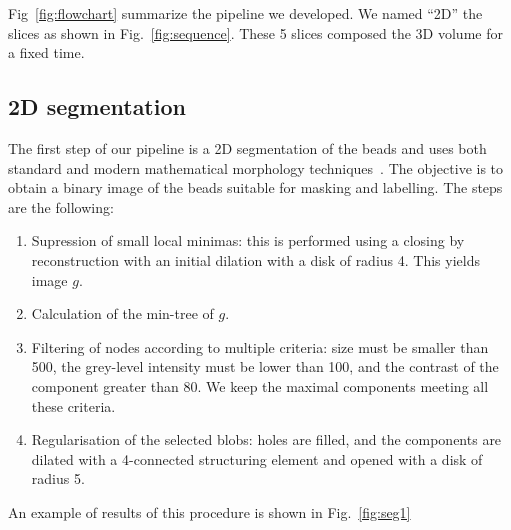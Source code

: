 \documentclass{llncs}
\begin{document}
Fig~\ref{fig:flowchart} summarize the pipeline we developed. We named ``2D'' the slices as shown in Fig.~\ref{fig:sequence}. These 5 slices composed the 3D volume for a fixed time.

\subsection{2D segmentation}
The first step of our pipeline is a 2D segmentation of the beads and uses both standard and modern mathematical morphology techniques~\cite{najman-talbot-Wiley-2010}. The objective is to obtain a binary image of the beads suitable for masking and labelling. The steps are the following:
\begin{enumerate}
\item Supression of small local minimas: this is performed using a closing by reconstruction with an initial dilation with a disk of radius 4. This yields image $g$.
\item Calculation of the min-tree of $g$.
\item Filtering of nodes according to multiple criteria: size must be smaller than 500, the grey-level intensity must be lower than 100, and the contrast of the component greater than 80. We keep the maximal components meeting all these criteria.
\item Regularisation of the selected blobs: holes are filled, and the components are dilated with a 4-connected structuring element and opened with a disk of radius 5.
\end{enumerate}
An example of results of this procedure is shown in Fig.~\ref{fig:seg1}
\end{document}

